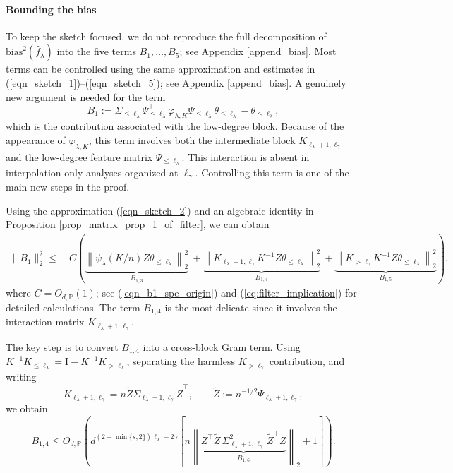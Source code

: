 \documentclass{article}
\theoremstyle{plain}
\theoremstyle{definition}
\theoremstyle{remark}
\newcommand{\rem}{\psi_\lambda}
\begin{document}
\begin{appendix}
\paragraph*{Bounding the bias} 


To keep the sketch focused, we do not reproduce the full decomposition of $\mathrm{bias}^2(\hat f_\lambda)$ into the five terms $B_1,\ldots,B_5$; see Appendix \ref{append_bias}. 
Most terms can be controlled using the same approximation and estimates in (\ref{eqn_sketch_1})--(\ref{eqn_sketch_5}); see Appendix \ref{append_bias}. 
A genuinely new argument is needed for the term
\[
B_{1}:=\Sigma_{\leq \ell_{\lambda}} \Psi^{\top}_{\leq \ell_{\lambda}} \varphi_{\lambda, K} \Psi_{\leq \ell_{\lambda}} \theta_{\leq \ell_{\lambda}} - \theta_{\leq \ell_{\lambda}},
\]
which is the contribution associated with the low-degree block.
Because of the appearance of $\varphi_{\lambda, K}$, this term involves both the intermediate block $K_{\ell_\lambda+1,\ell_\gamma}$ and the low-degree feature matrix $\Psi_{\leq \ell_{\lambda}}$. 
This interaction is absent in interpolation-only analyses organized at $\ell_\gamma$. 
Controlling this term is one of the main new steps in the proof.


Using the approximation (\ref{eqn_sketch_2}) and an algebraic identity in Proposition \ref{prop_matrix_prop_1_of_filter}, we can obtain
\begin{equation*}
    \begin{aligned}
        \|B_1\|_{2}^{2}   \leq  &~ C \left(
        \underbrace{\left\| \rem(K/n)  
                Z\theta_{\leq \ell_{\lambda}} \right\|_{2}^{2}}_{B_{1,3}}~+
                \underbrace{\left\| K_{\ell_{\lambda}+1, \ell_{\gamma}} K^{-1} Z \theta_{\leq \ell_{\lambda}} \right\|_{2}^{2}}_{B_{1,4}}~+
                \underbrace{\left\| K_{>\ell_{\gamma}} K^{-1} Z \theta_{\leq \ell_{\lambda}} \right\|_{2}^{2}}_{B_{1,5}}\right), 
    \end{aligned}
\end{equation*}
where $C=O_{d, \mathbb{P}}\left(1\right)$; see (\ref{eqn_b1_spe_origin}) and (\ref{eq:filter_implication}) for detailed calculations.
The term $B_{1,4}$ is the most delicate since it involves the interaction matrix $K_{\ell_{\lambda}+1, \ell_{\gamma}}$. 



The key step is to convert $B_{1,4}$ into a cross-block Gram term. 
Using $K^{-1}K_{\le \ell_\lambda}=\mathrm{I}-K^{-1}K_{>\ell_\lambda}$, separating the harmless $K_{>\ell_\gamma}$ contribution, and writing
\[
K_{\ell_\lambda+1,\ell_\gamma}
=
n\tilde Z\Sigma_{\ell_\lambda+1,\ell_\gamma}\tilde Z^\top,
\qquad
\tilde Z:=n^{-1/2}\Psi_{\ell_\lambda+1,\ell_\gamma},
\]
we obtain
\[
B_{1,4}
\le
O_{d,\mathbb P}\!\left(
d^{(2-\min\{s,2\})\ell_\lambda-2\gamma}
\left[
n\left\|   \underbrace{Z^\top \tilde Z\,\Sigma_{\ell_\lambda+1,\ell_\gamma}^2\,\tilde Z^\top Z}_{B_{1,6}}   \right\|_2
+1
\right]
\right).
\]




\end{appendix}
\end{document}
